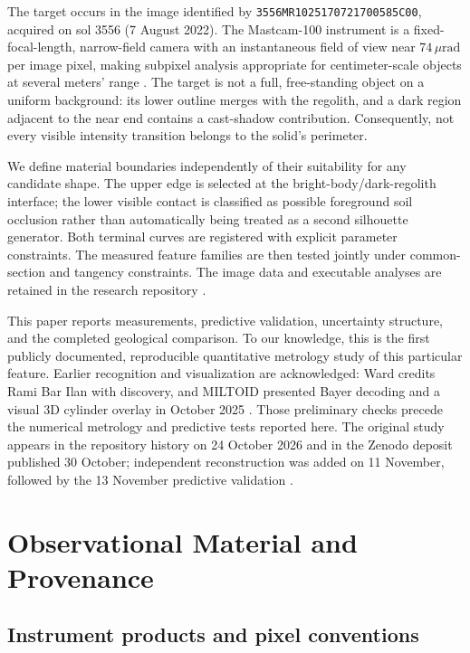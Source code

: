 \documentclass[11pt,letterpaper]{article}
\newcommand{\pdsid}{\texttt{3556MR1025170721700585C00}}
\begin{document}
The target occurs in the image identified by \pdsid, acquired on sol 3556 (7 August 2022). The Mastcam-100 instrument is a fixed-focal-length, narrow-field camera with an instantaneous field of view near \(74\,\mu\mathrm{rad}\) per image pixel, making subpixel analysis appropriate for centimeter-scale objects at several meters' range \cite{malin2017,bell2017}. The target is not a full, free-standing object on a uniform background: its lower outline merges with the regolith, and a dark region adjacent to the near end contains a cast-shadow contribution. Consequently, not every visible intensity transition belongs to the solid's perimeter.

We define material boundaries independently of their suitability for any candidate shape. The upper edge is selected at the bright-body/dark-regolith interface; the lower visible contact is classified as possible foreground soil occlusion rather than automatically being treated as a second silhouette generator. Both terminal curves are registered with explicit parameter constraints. The measured feature families are then tested jointly under common-section and tangency constraints. The image data and executable analyses are retained in the research repository \cite{bogner2026repo}.

This paper reports measurements, predictive validation, uncertainty structure, and the completed geological comparison. To our knowledge, this is the first publicly documented, reproducible quantitative metrology study of this particular feature. Earlier recognition and visualization are acknowledged: Ward credits Rami Bar Ilan with discovery, and MILTOID presented Bayer decoding and a visual 3D cylinder overlay in October 2025 \cite{ward2025,miltoid2025}. Those preliminary checks precede the numerical metrology and predictive tests reported here. The original study appears in the repository history on 24 October 2026 and in the Zenodo deposit published 30 October; independent reconstruction was added on 11 November, followed by the 13 November predictive validation \cite{bogner2026deposit}.

\section{Observational Material and Provenance}
\label{sec:data}

\subsection{Instrument products and pixel conventions}
\end{document}
